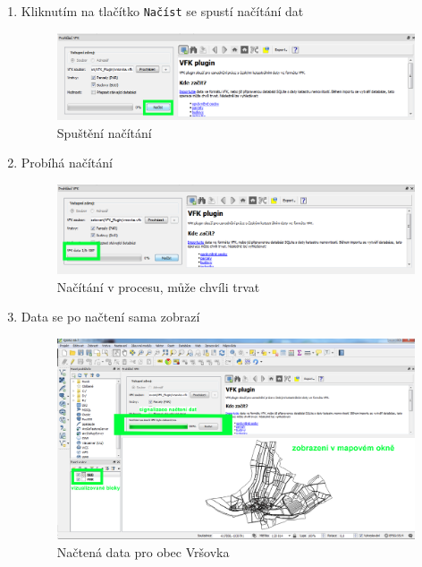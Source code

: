 \begin{enumerate}
  \newpage  
  \item{Kliknutím na tlačítko \texttt{Načíst} se spustí načítání dat}
  \begin{figure}[H]
	 \centering
      \includegraphics[width=15cm]{./pictures/nacteni_4kr.png}
      \caption{Spuštění načítání}
      \label{fig:4kr_nacteni}
  \end{figure}
  
  \item{Probíhá načítání}
  \begin{figure}[H]
	 \centering
      \includegraphics[width=15cm]{./pictures/nacteni_5kr.png}
      \caption{Načítání v procesu, může chvíli trvat}
      \label{fig:5kr_nacteni}
  \end{figure}
  
   \item{Data se po načtení sama zobrazí}
  \begin{figure}[H]
	 \centering
      \includegraphics[width=15cm]{./pictures/nacteni_6kr.png}
      \caption{Načtená data pro obec Vršovka}
      \label{fig:6kr_nacteni}
  \end{figure}
 \end{enumerate}
 

